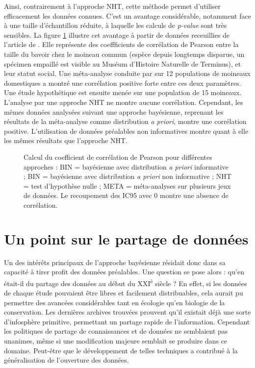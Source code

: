 \documentclass[11pt,twocolumn,twoside]{bopHomework}
\begin{document}
Ainsi, contrairement à l'approche NHT, cette méthode permet d'utiliser
efficacement les données connues.
C'est un avantage considérable, notamment face à une taille d'échantillon
réduite, à laquelle les calculs de \emph{p-value} sont très sensibles.
La figure \ref{fig:pearson} illustre cet avantage à partir de données
receuillies de l'article de \citet{garamszegi2009}.
Elle représente des coeffficients de corrélation de Pearson entre la taille du
bavoir chez le moineau commun (espèce depuis longtemps disparue, un spécimen
empaillé est visible au Muséum d'Histoire Naturelle de Terminus), et leur statut
social.
Une méta-analyse conduite par \citet{nakagawa2007} sur 12 populations de
moineaux domestiques a montré une corrélation positive forte entre ces deux
paramètres.
Une étude hypothétique est ensuite menée sur une population de 15 moineaux.
L'analyse par une approche NHT ne montre aucune corrélation.
Cependant, les mêmes données analysées suivant une approche bayésienne,
reprenant les résultats de la méta-analyse comme distribution \emph{a priori},
montre une corrélation positive.
L'utilisation de données préalables non informatives montre quant à elle les
mêmes résultats que l'approche NHT.

\begin{figure}[t]
  {\graphfont\centering}
  \caption{Calcul du coefficient de corrélation de Pearson pour différentes
    approches :
    BIN = bayésienne avec distribution \textit{a priori} informative ;
    BIN = bayésienne avec distribution \textit{a priori} non informative ;
    NHT = test d'hypothèse nulle ;
    META = méta-analyses sur plusieurs jeux de données.
    Le recoupement des IC95 avec 0 montre une absence de corrélation.
  }
  \label{fig:pearson}
\end{figure}


\section{Un point sur le partage de données}

Un des intérêts principaux de l'approche bayésienne résidait donc dans sa
capacité à tirer profit des données préalables.
Une question se pose alors : qu'en était-il du partage des données au début du
XXI\textsuperscript{è} siècle ?
En effet, si les données de chaque étude pouvaient être libres et facilement
distribuables, cela aurait pu permettre des avancées considérables tant en
écologie qu'en biologie de la conservation.
Les dernières archives trouvées prouvent qu'il existait déjà une sorte
d'infosphère primitive, permettant un partage rapide de l'information.
Cependant les politiques de partage de connaissances et de données ne semblaient
pas unanimes, même si une modification majeure semblait se produire dans ce
domaine.
Peut-être que le développement de telles techniques a contribué à la
généralisation de l'ouverture des données.


\begin{scriptsize}
  
\end{scriptsize}
\end{document}
